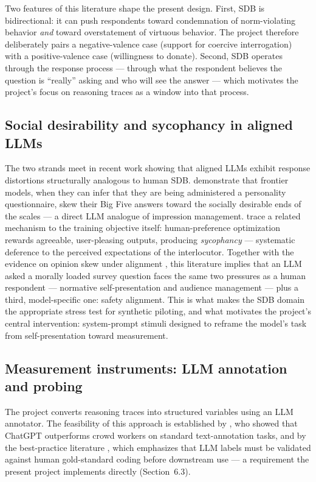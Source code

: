 \documentclass[14pt,a4paper]{extarticle}
\begin{document}
Two features of this literature shape the present design. First, SDB is bidirectional: it can push respondents toward condemnation of norm-violating behavior \emph{and} toward overstatement of virtuous behavior. The project therefore deliberately pairs a negative-valence case (support for coercive interrogation) with a positive-valence case (willingness to donate). Second, SDB operates through the response process --- through what the respondent believes the question is ``really'' asking and who will see the answer --- which motivates the project's focus on reasoning traces as a window into that process.

\subsection{Social desirability and sycophancy in aligned LLMs}

The two strands meet in recent work showing that aligned LLMs exhibit response distortions structurally analogous to human SDB. \cite{salecha2024} demonstrate that frontier models, when they can infer that they are being administered a personality questionnaire, skew their Big Five answers toward the socially desirable ends of the scales --- a direct LLM analogue of impression management. \cite{sharma2023} trace a related mechanism to the training objective itself: human-preference optimization rewards agreeable, user-pleasing outputs, producing \emph{sycophancy} --- systematic deference to the perceived expectations of the interlocutor. Together with the evidence on opinion skew under alignment \cite{santurkar2023}, this literature implies that an LLM asked a morally loaded survey question faces the same two pressures as a human respondent --- normative self-presentation and audience management --- plus a third, model-specific one: safety alignment. This is what makes the SDB domain the appropriate stress test for synthetic piloting, and what motivates the project's central intervention: system-prompt stimuli designed to reframe the model's task from self-presentation toward measurement.

\subsection{Measurement instruments: LLM annotation and probing}

The project converts reasoning traces into structured variables using an LLM annotator. The feasibility of this approach is established by \cite{gilardi2023}, who showed that ChatGPT outperforms crowd workers on standard text-annotation tasks, and by the best-practice literature \cite{tornberg2024}, which emphasizes that LLM labels must be validated against human gold-standard coding before downstream use --- a requirement the present project implements directly (Section~6.3).
\end{document}
